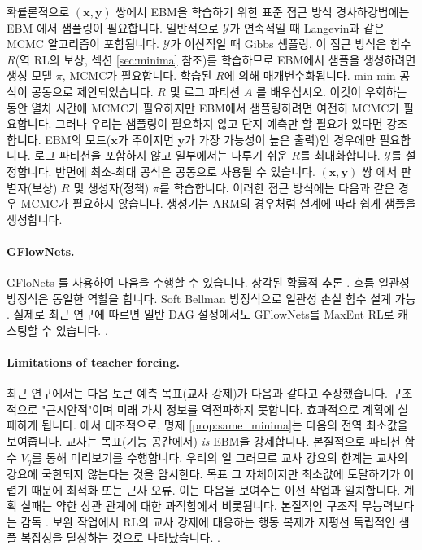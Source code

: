 \documentclass{article}
\def\x{{\bm{x}}}
\def\y{{\bm{y}}}
\def\cY{{\mathcal{Y}}}
\begin{document}
확률론적으로 $(\x, \y)$ 쌍에서 EBM을 학습하기 위한 표준 접근 방식
경사하강법에는 EBM \citep{song2021train} 에서 샘플링이 필요합니다.
일반적으로 $\cY$가 연속적일 때 Langevin과 같은 MCMC 알고리즘이 포함됩니다.
$\cY$가 이산적일 때 Gibbs 샘플링. 이 접근 방식은 함수 $R$(역 RL의 보상, 섹션 \ref{sec:minima} 참조)를 학습하므로
EBM에서 샘플을 생성하려면 생성 모델 $\pi$, MCMC가 필요합니다.
학습된 $R$에 의해 매개변수화됩니다.  min-min 공식이 공동으로 제안되었습니다.
$R$ 및 로그 파티션 $A$ \citep{sander2025joint} 를 배우십시오. 이것이 우회하는 동안
열차 시간에 MCMC가 필요하지만 EBM에서 샘플링하려면 여전히 MCMC가 필요합니다.
그러나 우리는 샘플링이 필요하지 않고 단지 예측만 할 필요가 있다면 강조합니다.
EBM의 모드($\x$가 주어지면 $\y$가 가장 가능성이 높은 출력)인 경우에만 필요합니다.
로그 파티션을 포함하지 않고 일부에서는 다루기 쉬운 $R$를 최대화합니다.
$\cY$를 설정합니다.  반면에 최소-최대 공식은 공동으로 사용될 수 있습니다.
$(\x,
\y)$ 쌍 \citep{ho2016generative} 에서 판별자(보상) $R$ 및 생성자(정책) $\pi$를 학습합니다. 이러한 접근 방식에는 다음과 같은 경우 MCMC가 필요하지 않습니다.
생성기는 ARM의 경우처럼 설계에 따라 쉽게 샘플을 생성합니다.

\paragraph{GFlowNets.}

GFloNets \citep{bengio2021flow,bengio2023gflownet}를 사용하여 다음을 수행할 수 있습니다.
상각된 확률적 추론 \citep{hu2023amortizing} . 흐름 일관성 방정식은 동일한 역할을 합니다.
Soft Bellman 방정식으로 일관성 손실 함수 설계 가능
 \citep{malkin2022trajectory} .  실제로 최근 연구에 따르면
일반 DAG 설정에서도 GFlowNets를 MaxEnt RL로 캐스팅할 수 있습니다.
 \citep{tiapkin2024generative} .

\paragraph{Limitations of teacher forcing.}

최근 연구에서는 다음 토큰 예측 목표(교사 강제)가 다음과 같다고 주장했습니다.
구조적으로 "근시안적"이며 미래 가치 정보를 역전파하지 못합니다.
효과적으로 \citep{bachmann2024pitfalls} 계획에 실패하게 됩니다.  에서
대조적으로, 명제 \ref{prop:same_minima}는 다음의 전역 최소값을 보여줍니다.
교사는 목표(기능 공간에서) \textit{is} EBM을 강제합니다.
본질적으로 파티션 함수 $V_q$를 통해 미리보기를 수행합니다. 우리의 일
그러므로 교사 강요의 한계는 교사의 강요에 국한되지 않는다는 것을 암시한다.
목표 그 자체이지만 최소값에 도달하기가 어렵기 때문에
최적화 또는 근사 오류.  이는 다음을 보여주는 이전 작업과 일치합니다.
계획 실패는 약한 상관 관계에 대한 과적합에서 비롯됩니다.
본질적인 구조적 무능력보다는 감독
 \citep{frydenlund2024mystery} .
보완 작업에서 RL의 교사 강제에 대응하는 행동 복제가 지평선 독립적인 샘플 복잡성을 달성하는 것으로 나타났습니다.
 \citep{foster2024behavior} .
\end{document}
